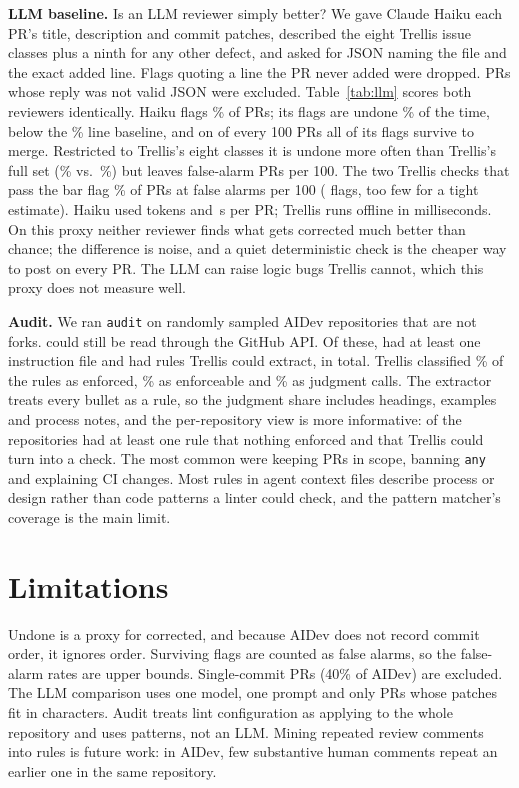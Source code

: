 \documentclass[sigconf]{acmart}
\begin{document}
\textbf{LLM baseline.} Is an LLM reviewer simply better? We gave Claude Haiku each PR's title, description and commit patches, described the eight Trellis issue classes plus a ninth for any other defect, and asked for JSON naming the file and the exact added line. Flags quoting a line the PR never added were dropped. PRs whose reply was not valid JSON were excluded. Table~\ref{tab:llm} scores both reviewers identically. Haiku flags \lLlmAllPct\% of PRs; its flags are undone \lLlmAllUndone\% of the time, below the \lBase\% line baseline, and on \lLlmAllFa{} of every 100 PRs all of its flags survive to merge. Restricted to Trellis's eight classes it is undone more often than Trellis's full set (\lLlmSameUndone\% vs.\ \lTrAllUndone\%) but leaves \lLlmSameFa{} false-alarm PRs per 100. The two Trellis checks that pass the bar flag \lTrTwoPct\% of PRs at \lTrTwoFa{} false alarms per 100 (\lTrTwoN{} flags, too few for a tight estimate). Haiku used \lTokPerPR{} tokens and \lSec{}\,s per PR; Trellis runs offline in milliseconds. On this proxy neither reviewer finds what gets corrected much better than chance; the difference is noise, and a quiet deterministic check is the cheaper way to post on every PR. The LLM can raise logic bugs Trellis cannot, which this proxy does not measure well.

\textbf{Audit.} We ran \texttt{audit} on \aSampled{} randomly sampled AIDev repositories that are not forks. \aReachable{} could still be read through the GitHub API. Of these, \aWithInstructionFiles{} had at least one instruction file and \aWithRules{} had rules Trellis could extract, \aRules{} in total. Trellis classified \aEnforcedPct\% of the rules as enforced, \aEnforceablePct\% as enforceable and \aJudgmentPct\% as judgment calls. The extractor treats every bullet as a rule, so the judgment share includes headings, examples and process notes, and the per-repository view is more informative: \aReposWithUnenforcedCheckableRule{} of the \aWithRules{} repositories had at least one rule that nothing enforced and that Trellis could turn into a check. The most common were keeping PRs in scope, banning \texttt{any} and explaining CI changes. Most rules in agent context files describe process or design rather than code patterns a linter could check, and the pattern matcher's coverage is the main limit.

\section{Limitations}
Undone is a proxy for corrected, and because AIDev does not record commit order, it ignores order. Surviving flags are counted as false alarms, so the false-alarm rates are upper bounds. Single-commit PRs (40\% of AIDev) are excluded. The LLM comparison uses one model, one prompt and only PRs whose patches fit in \lMaxChars{} characters. Audit treats lint configuration as applying to the whole repository and uses patterns, not an LLM. Mining repeated review comments into rules is future work: in AIDev, few substantive human comments repeat an earlier one in the same repository.
\end{document}
